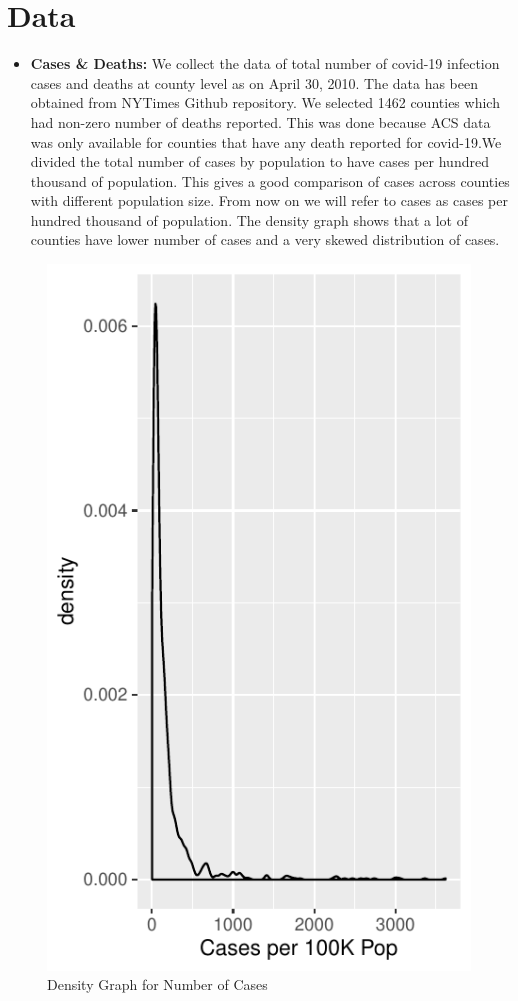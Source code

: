 \documentclass[
]{article}
\providecommand{\tightlist}{%
  \setlength{\itemsep}{0pt}\setlength{\parskip}{0pt}}
\begin{document}
\hypertarget{data}{%
\section{Data}\label{data}}

\begin{itemize}
\tightlist
\item
  \textbf{Cases \& Deaths:} We collect the data of total number of
  covid-19 infection cases and deaths at county level as on April 30,
  2010. The data has been obtained from NYTimes Github repository. We
  selected 1462 counties which had non-zero number of deaths reported.
  This was done because ACS data was only available for counties that
  have any death reported for covid-19.We divided the total number of
  cases by population to have cases per hundred thousand of population.
  This gives a good comparison of cases across counties with different
  population size. From now on we will refer to cases as cases per
  hundred thousand of population. The density graph shows that a lot of
  counties have lower number of cases and a very skewed distribution of
  cases.
\end{itemize}

\begin{figure}
\centering
\includegraphics{covid_tree_analysis_files/figure-latex/unnamed-chunk-3-1.pdf}
\caption{Density Graph for Number of Cases}
\end{figure}
\end{document}
